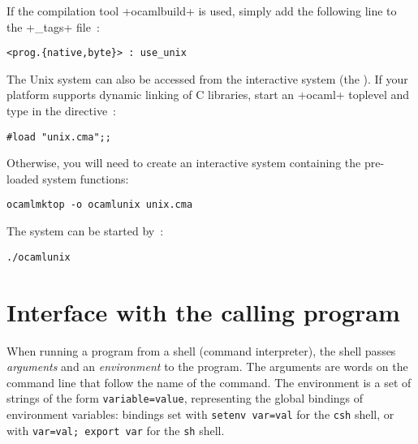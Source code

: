 If the compilation tool  \ml+ocamlbuild+ is used, simply add the
following line to the 
\ml+_tags+ file~:
%
\begin{lstlisting}
<prog.{native,byte}> : use_unix
\end{lstlisting}
%
The Unix system can also be accessed from the interactive system (the
). If your platform supports dynamic linking of C
libraries, start an \ml+ocaml+ toplevel and type in the directive~:
%
\begin{lstlisting}
#load "unix.cma";;
\end{lstlisting}
%
Otherwise, you will need to create an interactive system containing
the pre-loaded system functions:
%
\begin{lstlisting}
ocamlmktop -o ocamlunix unix.cma
\end{lstlisting}
%
The system can be started by~:
%
\begin{lstlisting}
./ocamlunix
\end{lstlisting}

\section{Interface with the calling program}

When running a program from a shell (command interpreter), the shell
passes \emph{arguments} and an \emph{environment} to the program.  The
arguments are words on the command line that follow the name of the
command. The environment is a set of strings of the form
\texttt{variable=value}, representing the global bindings of environment
variables: bindings set with \texttt{setenv var=val} for the
\texttt{csh} shell, or with \texttt{var=val; export var} for
the \texttt{sh} shell.

